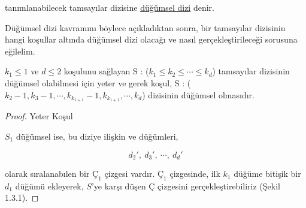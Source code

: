 \documentclass[11pt]{amsbook}
\begin{document}


\begin{definition}
    tanımlanabilecek tamsayılar dizisine \underline{düğümsel dizi} denir.
\end{definition}


Düğümsel dizi kavramını böylece açıkladıktan sonra, bir tamsayılar dizisinin hangi koşullar altında düğümsel dizi olacağı ve nasıl gerçekleştirileceği sorusuna eğilelim.

\begin{theorem} 
$k_{1} \leq 1$ ve $d \leq 2$ koşulunu sağlayan S : ($k_{1} \leq k_{2} \leq \cdots \leq k_{d}$) tamsayılar dizisinin düğümsel olabilmesi için yeter ve gerek koşul, S : ($k_{2}-1, k_{3}-1, \cdots,k_{k_{1+1}}-1,k_{k_{1+1}},\cdots,k_{d}$) dizisinin düğümsel olmasıdır.

    \begin{proof}
    Yeter Koşul
    
    $S_{1}$ düğümsel ise, bu diziye ilişkin ve düğümleri,
    
    \[
        d_{2}\prime,\ d_{3}\prime, \ \cdots,\ d_{d}\prime 
    \]
    
    olarak sıralanabılen bir $Ç_{1}$ çizgesi vardır. $Ç_{1}$ çizgesinde, ilk $k_{1}$ düğüme bitişik bir $d_{1}$ düğümü ekleyerek, $S$'ye karşı düşen $Ç$ çizgesini gerçekleştirebiliriz (Şekil 1.3.1). 
    \end{proof}
    
\end{theorem}
\end{document}
